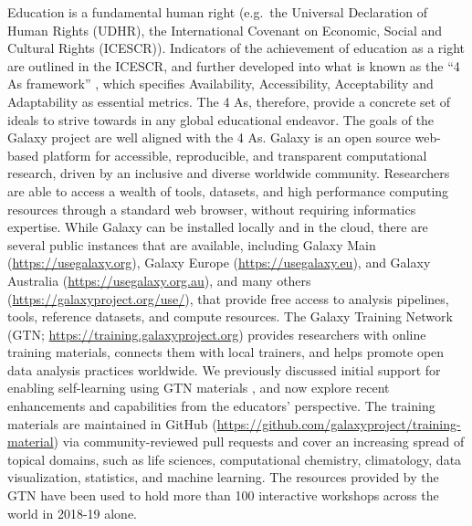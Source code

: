 \documentclass[10pt,letterpaper]{article}
\begin{document}
Education is a fundamental human right (e.g.\ the Universal Declaration of Human Rights (UDHR), the International Covenant on Economic, Social and Cultural Rights (ICESCR)).
Indicators of the achievement of education as a right are outlined in the ICESCR, and further developed into what is known as the “4 As framework” \cite{tomavsevski2001human}, which specifies Availability, Accessibility, Acceptability and Adaptability as essential metrics.
The 4 As, therefore, provide a concrete set of ideals to strive towards in any global educational endeavor.
The goals of the Galaxy project are well aligned with the 4 As.
Galaxy \cite{Afgan2018} is an open source web-based platform for accessible, reproducible, and transparent computational research, driven by an inclusive and diverse worldwide community. %
Researchers are able to access a wealth of tools, datasets, and high performance computing resources through a standard web browser, without requiring informatics expertise.
While Galaxy can be installed locally and in the cloud, there are several public instances that are available, including Galaxy Main (\url{https://usegalaxy.org}), Galaxy Europe (\url{https://usegalaxy.eu}), and Galaxy Australia (\url{https://usegalaxy.org.au}), and many others (\url{https://galaxyproject.org/use/}), that provide free access to analysis pipelines, tools, reference datasets, and compute resources. %
The Galaxy Training Network (GTN; \url{https://training.galaxyproject.org}) provides researchers with online training materials, connects them with local trainers, and helps promote open data analysis practices worldwide. We previously discussed initial support for enabling self-learning using GTN materials \cite{Batut2018}, and now explore recent enhancements and capabilities from the educators’ perspective.
The training materials are maintained in GitHub (\url{https://github.com/galaxyproject/training-material}) via community-reviewed pull requests and cover an increasing spread of topical domains, such as life sciences, computational chemistry, climatology, data visualization, statistics, and machine learning. %
The resources provided by the GTN have been used to hold more than 100 interactive workshops across the world in 2018-19 alone.%
\end{document}
